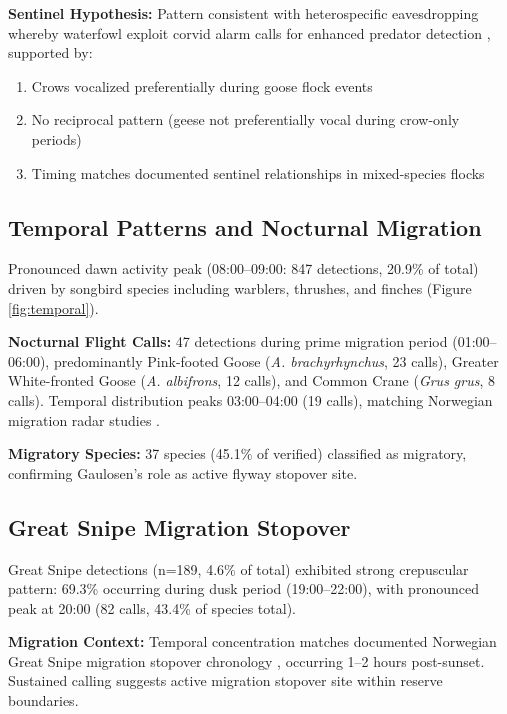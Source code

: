 \documentclass[twocolumn]{article}
\begin{document}
\textbf{Sentinel Hypothesis:} Pattern consistent with heterospecific eavesdropping whereby waterfowl exploit corvid alarm calls for enhanced predator detection \citep{Magrath2015}, supported by:

\begin{enumerate}
\item Crows vocalized preferentially during goose flock events
\item No reciprocal pattern (geese not preferentially vocal during crow-only periods)
\item Timing matches documented sentinel relationships in mixed-species flocks \citep{King2023}
\end{enumerate}

\subsection{Temporal Patterns and Nocturnal Migration}

Pronounced dawn activity peak (08:00--09:00: 847 detections, 20.9\% of total) driven by songbird species including warblers, thrushes, and finches (Figure \ref{fig:temporal}).

\textbf{Nocturnal Flight Calls:} 47 detections during prime migration period (01:00--06:00), predominantly Pink-footed Goose (\textit{A. brachyrhynchus}, 23 calls), Greater White-fronted Goose (\textit{A. albifrons}, 12 calls), and Common Crane (\textit{Grus grus}, 8 calls). Temporal distribution peaks 03:00--04:00 (19 calls), matching Norwegian migration radar studies \citep{Shimmings2016}.

\textbf{Migratory Species:} 37 species (45.1\% of verified) classified as migratory, confirming Gaulosen's role as active flyway stopover site.

\subsection{Great Snipe Migration Stopover}

Great Snipe detections (n=189, 4.6\% of total) exhibited strong crepuscular pattern: 69.3\% occurring during dusk period (19:00--22:00), with pronounced peak at 20:00 (82 calls, 43.4\% of species total).

\textbf{Migration Context:} Temporal concentration matches documented Norwegian Great Snipe migration stopover chronology \citep{Kålås1995}, occurring 1--2 hours post-sunset. Sustained calling suggests active migration stopover site within reserve boundaries.
\end{document}

